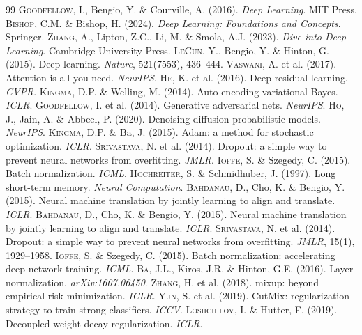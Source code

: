 \documentclass[12pt,a4paper,twoside]{book}
\theoremstyle{definition}
\theoremstyle{plain}
\theoremstyle{remark}
\begin{document}
\begin{thebibliography}{99}
 \textsc{Goodfellow}, I., Bengio, Y. \& Courville, A. (2016). \emph{Deep Learning}. MIT Press.
 \textsc{Bishop}, C.M. \& Bishop, H. (2024). \emph{Deep Learning: Foundations and Concepts}. Springer.
 \textsc{Zhang}, A., Lipton, Z.C., Li, M. \& Smola, A.J. (2023). \emph{Dive into Deep Learning}. Cambridge University Press.
 \textsc{LeCun}, Y., Bengio, Y. \& Hinton, G. (2015). Deep learning. \emph{Nature}, 521(7553), 436--444.
 \textsc{Vaswani}, A. et al. (2017). Attention is all you need. \emph{NeurIPS}.
 \textsc{He}, K. et al. (2016). Deep residual learning. \emph{CVPR}.
 \textsc{Kingma}, D.P. \& Welling, M. (2014). Auto-encoding variational Bayes. \emph{ICLR}.
 \textsc{Goodfellow}, I. et al. (2014). Generative adversarial nets. \emph{NeurIPS}.
 \textsc{Ho}, J., Jain, A. \& Abbeel, P. (2020). Denoising diffusion probabilistic models. \emph{NeurIPS}.
 \textsc{Kingma}, D.P. \& Ba, J. (2015). Adam: a method for stochastic optimization. \emph{ICLR}.
 \textsc{Srivastava}, N. et al. (2014). Dropout: a simple way to prevent neural networks from overfitting. \emph{JMLR}.
 \textsc{Ioffe}, S. \& Szegedy, C. (2015). Batch normalization. \emph{ICML}.
 \textsc{Hochreiter}, S. \& Schmidhuber, J. (1997). Long short-term memory. \emph{Neural Computation}.
 \textsc{Bahdanau}, D., Cho, K. \& Bengio, Y. (2015). Neural machine translation by jointly learning to align and translate. \emph{ICLR}.
 \textsc{Bahdanau}, D., Cho, K. \& Bengio, Y. (2015). Neural machine translation by jointly learning to align and translate. \emph{ICLR}.
 \textsc{Srivastava}, N. et al. (2014). Dropout: a simple way to prevent neural networks from overfitting. \emph{JMLR}, 15(1), 1929--1958.
 \textsc{Ioffe}, S. \& Szegedy, C. (2015). Batch normalization: accelerating deep network training. \emph{ICML}.
 \textsc{Ba}, J.L., Kiros, J.R. \& Hinton, G.E. (2016). Layer normalization. \emph{arXiv:1607.06450}.
 \textsc{Zhang}, H. et al. (2018). mixup: beyond empirical risk minimization. \emph{ICLR}.
 \textsc{Yun}, S. et al. (2019). CutMix: regularization strategy to train strong classifiers. \emph{ICCV}.
 \textsc{Loshchilov}, I. \& Hutter, F. (2019). Decoupled weight decay regularization. \emph{ICLR}.

\end{thebibliography}
\end{document}
